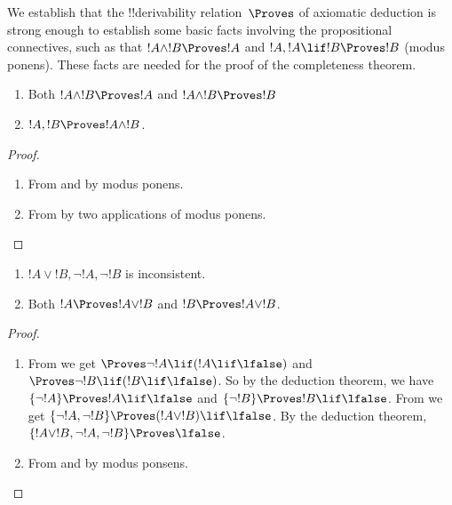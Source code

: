 \documentclass[../../../include/open-logic-section]{subfiles}
\begin{document}
      {}
      {}


\begin{explain}
  We establish that the !!{derivability} relation~$\Proves$ of
  axiomatic deduction is strong enough to establish some basic facts
  involving the propositional connectives, such as that $!A \land !B
  \Proves !A$ and $!A, !A \lif !B \Proves !B$ (modus ponens). These
  facts are needed for the proof of the completeness theorem.
\end{explain}

\begin{prop}
  \begin{enumerate}
  \item {} Both $!A \land !B \Proves
    !A$ and $!A \land !B \Proves !B$
  \item {} $!A, !B \Proves !A \land !B$.
  \end{enumerate}
\end{prop}

\begin{proof}
  \begin{enumerate}
    \item From  and  by
      modus ponens.
  \item From  by two applications of
    modus ponens.
  \end{enumerate}
\end{proof}


\begin{prop}
  \begin{enumerate}
  \item $!A \lor !B, \lnot !A, \lnot !B$ is inconsistent.
  \item Both $!A \Proves !A \lor !B$ and $!B \Proves !A \lor !B$.
  \end{enumerate}
\end{prop}

\begin{proof}
  \begin{enumerate}
  \item From  we get $\Proves \lnot !A \lif (!A
    \lif \lfalse)$ and $\Proves \lnot !B \lif (!B \lif \lfalse)$. So
    by the deduction theorem, we have $\{\lnot !A\} \Proves !A \lif
    \lfalse$ and $\{\lnot !B\} \Proves !B \lif \lfalse$. From
     we get $\{\lnot !A, \lnot !B\} \Proves (!A
    \lor !B) \lif \lfalse$. By the deduction theorem, $\{!A \lor !B,
    \lnot !A, \lnot !B\} \Proves \lfalse$.
  \item From  and  by modus
    ponsens.
  \end{enumerate}
\end{proof}
\end{document}
